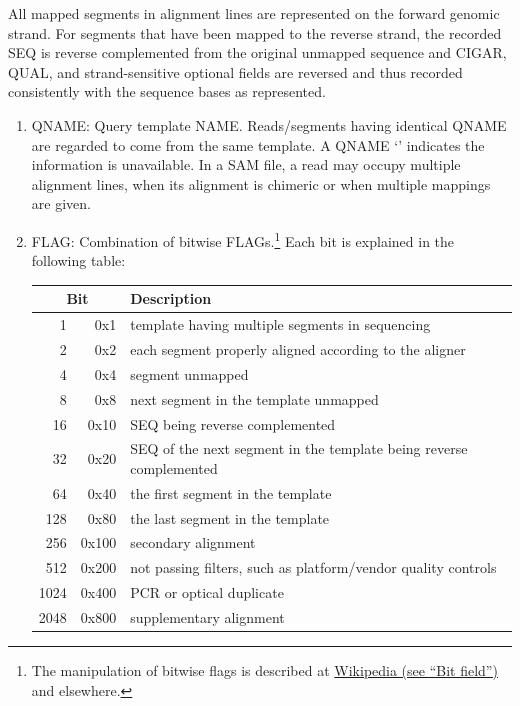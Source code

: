 \documentclass[10pt]{article}
\begin{document}
\noindent
All mapped segments in alignment lines are represented on the forward genomic strand.
For segments that have been mapped to the reverse strand, the recorded {\sf SEQ} is reverse complemented from the original unmapped sequence and {\sf CIGAR}, {\sf QUAL}, and strand-sensitive optional fields are reversed and thus recorded consistently with the sequence bases as represented.

\begin{enumerate}
\item {\sf QNAME}: Query template NAME. Reads/segments having identical {\sf QNAME}
	are regarded to come from the same template. A {\sf QNAME} `{\tt *}'
	indicates the information is unavailable.  In a SAM file, a read may occupy
	multiple alignment lines, when its alignment is chimeric or when multiple
	mappings are given.
\item {\sf FLAG}: Combination of bitwise FLAGs.\footnote{The manipulation of
bitwise flags is described at \href{http://en.wikipedia.org/wiki/Bit\_field}
{Wikipedia (see ``Bit field'')} and elsewhere.}
Each bit is explained in the following table:
  \begin{center}\small
  \begin{tabular}{rrl}
  \hline
  \multicolumn{2}{c}{Bit} & Description\\
  \hline
    1 &    0x1 & template having multiple segments in sequencing \\
    2 &    0x2 & each segment properly aligned according to the aligner \\
    4 &    0x4 & segment unmapped \\
    8 &    0x8 & next segment in the template unmapped \\
   16 &   0x10 & {\sf SEQ} being reverse complemented \\
   32 &   0x20 & {\sf SEQ} of the next segment in the template being reverse complemented \\
   64 &   0x40 & the first segment in the template \\
  128 &   0x80 & the last segment in the template \\
  256 &  0x100 & secondary alignment \\
  512 &  0x200 & not passing filters, such as platform/vendor quality controls \\
 1024 &  0x400 & PCR or optical duplicate \\
 2048 &  0x800 & supplementary alignment \\
  \hline
  \end{tabular}

\end{center}
\end{enumerate}
\end{document}
